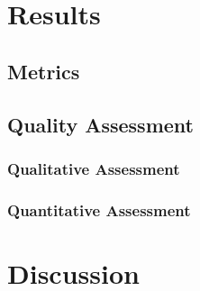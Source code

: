 \documentclass{article}
\begin{document}
	\section{Results}
	\subsection{Metrics}
	\subsection{Quality Assessment}
	\subsubsection{Qualitative Assessment}
	\subsubsection{Quantitative Assessment}
	
	\section{Discussion}
	
\end{document}
